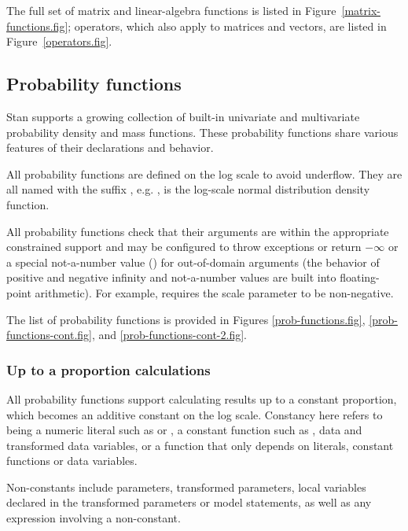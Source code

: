 \documentclass[article]{jss}
\begin{document}
The full set of matrix and linear-algebra functions is listed in
Figure~\ref{matrix-functions.fig}; operators, which also apply to
matrices and vectors, are listed in Figure~\ref{operators.fig}.

\subsection{Probability functions}

Stan supports a growing collection of built-in univariate and
multivariate probability density and mass functions.  These
probability functions share various features of their declarations and
behavior.

All probability functions are defined on the log scale to avoid
underflow.  They are all named with the suffix , e.g.
, is the log-scale normal distribution density
function.

All probability functions check that their arguments are within the
appropriate constrained support and may be configured to throw
exceptions or return $-\infty$ or a special not-a-number value
() for out-of-domain arguments (the behavior of positive and
negative infinity and not-a-number values are built into
floating-point arithmetic).  For example,
   requires the scale parameter
 to be non-negative.

The list of probability functions is provided in Figures
\ref{prob-functions.fig}, \ref{prob-functions-cont.fig}, and
\ref{prob-functions-cont-2.fig}. 

\subsubsection{Up to a proportion calculations}

All probability functions support calculating results up to a constant
proportion, which becomes an additive constant on the log scale.
Constancy here refers to being a numeric literal such as  or
, a constant function such as , data and
transformed data variables, or a function that only depends on
literals, constant functions or data variables.

Non-constants include parameters, transformed parameters, local
variables declared in the transformed parameters or model statements,
as well as any expression involving a non-constant.
\end{document}
